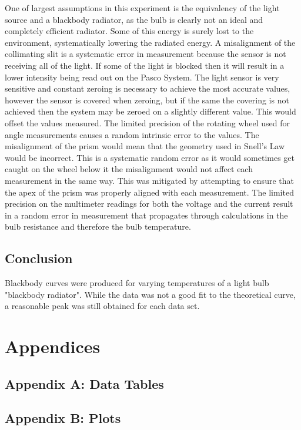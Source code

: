 \documentclass[a4paper]{article}
\begin{document}
\qq One of largest assumptions in this experiment is the equivalency of the light
source and a blackbody radiator, as the bulb is clearly not an
ideal and completely efficient radiator. Some of this energy is surely lost to the environment, systematically 
lowering the radiated energy. 
A misalignment of the collimating slit is a systematic error in
measurement because the sensor is not receiving all of the light. If
some of the light is blocked then it will result in a lower intensity
being read out on the Pasco System. The light sensor is very sensitive
and constant zeroing is necessary to achieve the most accurate values,
however the sensor is covered when zeroing, but if the same the
covering is not achieved then the system may be zeroed on a slightly
different value. This would offset the values measured. The limited
precision of the rotating wheel used for angle measurements causes a
random intrinsic error to the values. The misalignment of the prism
would mean that the geometry used in Snell's Law would be
incorrect. This is a systematic random error as it would sometimes get
caught on the wheel below it the misalignment would not affect each
measurement in the same way. This was mitigated by attempting to
ensure that the apex of the prism was properly aligned with each
measurement. The limited precision on the multimeter readings for both
the voltage and the current result in a random error in measurement
that propagates through calculations in the bulb resistance and
therefore the bulb temperature.

\subsection{Conclusion}
Blackbody curves were produced for varying temperatures of a light bulb "blackbody radiator". While the data was not a good fit to the theoretical curve, a reasonable peak was still obtained for each data set.

\section{Appendices}

\subsection{Appendix A: Data Tables}

\subsection{Appendix B: Plots}
\label{app:stoppingPotentialPlots}
\end{document}

